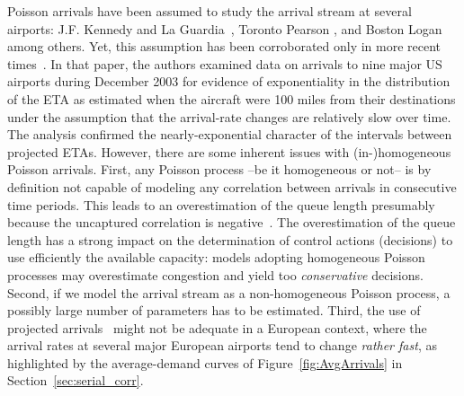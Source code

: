 \documentclass[draft,review]{elsarticle}
\begin{document}
Poisson arrivals have been assumed to study the arrival stream at several airports:  J.F. Kennedy and La Guardia~\citep{Koop1972}, Toronto Pearson \citep{Bookbinder1986}, and Boston Logan~\citep{HO1975} among others. Yet, this assumption has been corroborated only in more recent times~\citep{willemain2004statistical}.
In that paper, the authors examined data on arrivals to nine major US airports during December 2003 for evidence of exponentiality in the distribution of the \ac{ETA} as estimated when the aircraft were 100 miles from their destinations under the assumption that the arrival-rate changes are relatively slow over time. The analysis confirmed the nearly-exponential character of the intervals between projected \acp{ETA}.
However, there are some inherent issues with (in-)homogeneous Poisson arrivals.
First, any Poisson process --be it homogeneous or not-- is by definition not capable of modeling any correlation between arrivals in consecutive time periods.
This leads to an overestimation of the queue length presumably because the uncaptured correlation is negative~\citep{caccavale2014model}.
The overestimation of the queue length has a strong impact on the determination of control actions (decisions) to use efficiently the available capacity: models adopting homogeneous Poisson processes may overestimate congestion and yield too \emph{conservative} decisions.
Second, if we model the arrival stream as a non-homogeneous Poisson process, a possibly large number of parameters has to be estimated. %
Third, the use of projected arrivals~\citep{willemain2004statistical} might not be adequate in a European context, where the arrival rates at several major European airports tend to change \emph{rather fast}, as highlighted by the average-demand curves of Figure~\ref{fig:AvgArrivals} in Section~\ref{sec:serial_corr}.
\end{document}
